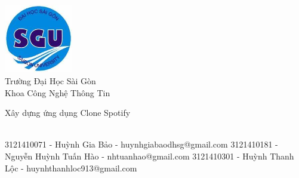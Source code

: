 \documentclass[a4paper,11pt,oneside]{book}
\def\groupuninamel{Trường Đại Học Sài Gòn}
\def\groupdepnamel{Công Nghệ Thông Tin}
\begin{document}
    
    \frontmatter
    
        \begin{titlepage}      
        \begin{center}
            \includegraphics[width=3cm]{figures/sgulogo.png}\\[0.5cm]
            {\LARGE \groupuninamel\\[0.5cm]
            Khoa \groupdepnamel}\\[2cm]
			
            \linespread{1.2}\huge {
                Xây dựng ứng dụng Clone Spotify
            
            }
            \linespread{1}~\\[2cm]
            {\Large 
                3121410071 - Huỳnh Gia Bảo - huynhgiabaodhsg@gmail.com
                3121410181 - Nguyễn Huỳnh Tuấn Hào - nhtuanhao@gmail.com
                3121410301 - Huỳnh Thanh Lộc - huynhthanhloc913@gmail.com
            }\\[1cm] 
            


\end{center}
\end{titlepage}
\end{document}
